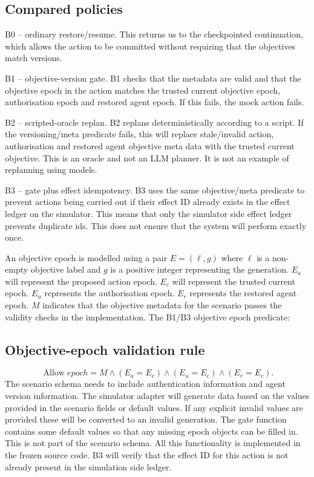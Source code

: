 \documentclass[conference]{IEEEtran}
\begin{document}
\subsection{Compared policies}
\begin{description}
\item{B0 -- ordinary restore/resume.} This returns us to the checkpointed continuation, which allows the action to be committed without requiring that the objectives match versions.
\item{B1 -- objective-version gate.} B1 checks that the metadata are valid and that the objective epoch in the action matches the trusted current objective epoch, authorisation epoch and restored agent epoch. If this fails, the mock action fails.
\item{B2 -- scripted-oracle replan.} B2 replans deterministically according to a script. If the versioning/meta predicate fails, this will replace stale/invalid action, authorisation and restored agent objective meta data with the trusted current objective. This is an oracle and not an LLM planner. It is not an example of replanning using models.
\item{B3 -- gate plus effect idempotency.} B3 uses the same objective/meta predicate to prevent actions being carried out if their effect ID already exists in the effect ledger on the simulator. This means that only the simulator side effect ledger prevents duplicate ids. This does not ensure that the system will perform exactly once.
\end{description}

An objective epoch is modelled using a pair $E = (\ell, g)$ where $\ell$ is a non-empty objective label and $g$ is a positive integer representing the generation. $E_a$ will represent the proposed action epoch. $E_c$ will represent the trusted current epoch. $E_u$ represents the authorisation epoch. $E_r$ represents the restored agent epoch. $M$ indicates that the objective metadata for the scenario passes the validity checks in the implementation. The B1/B3 objective epoch predicate:
\subsection{Objective-epoch validation rule}
\begin{equation}
\operatorname{Allow}{epoch} = M \land (E_a = E_c) \land (E_u = E_c) \land (E_r = E_c).
\end{equation}
The scenario schema needs to include authentication information and agent version information. The simulator adapter will generate data based on the values provided in the scenario fields or default values. If any explicit invalid values are provided these will be converted to an invalid generation. The gate function contains some default values so that any missing epoch objects can be filled in. This is not part of the scenario schema. All this functionality is implemented in the frozen source code. B3 will verify that the effect ID for this action is not already present in the simulation side ledger.
\end{document}
